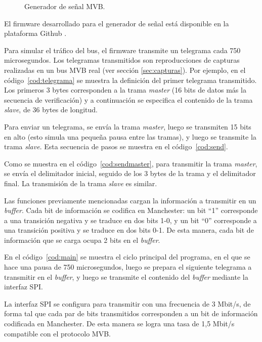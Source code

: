 \begin{figure}[htbp]
	\centering
    {
        \fontsize{8pt}{8pt}\selectfont
        
    }
	\caption{Generador de señal MVB.}
    \label{fig:generador}
\end{figure}

El firmware desarrollado para el generador de señal está disponible en la plataforma Github \cite{mvbgen}.

Para simular el tráfico del bus, el firmware transmite un telegrama cada 750 microsegundos.
Los telegramas transmitidos son reproducciones de capturas realizadas en un bus MVB real (ver sección \ref{sec:capturas}). Por ejemplo, en el código~\ref{cod:telegrama} se muestra la definición del primer telegrama transmitido.
Los primeros 3 bytes corresponden a la trama \textit{master} (16 bits de datos más la secuencia de verificación) y a continuación se especifica el contenido de la trama \textit{slave}, de 36 bytes de longitud.

Para enviar un telegrama, se envía la trama \textit{master}, luego se transmiten 15 bits en alto (esto simula una pequeña pausa entre las tramas), y luego se transmite la trama \textit{slave}. Esta secuencia de pasos se muestra en el código~\ref{cod:send}.

Como se muestra en el código~\ref{cod:sendmaster}, para transmitir la trama \textit{master}, se envía el delimitador inicial, seguido de los 3 bytes de la trama y el delimitador final. La transmisión de la trama \textit{slave} es similar.

Las funciones previamente mencionadas cargan la información a transmitir en un \textit{buffer}. Cada bit de información se codifica en Manchester: un bit ``1'' corresponde a una transición negativa y se traduce en dos bits 1-0, y un bit ``0'' corresponde a una transición positiva y se traduce en dos bits 0-1. De esta manera, cada bit de información que se carga ocupa 2 bits en el \textit{buffer}.

En el código~\ref{cod:main} se muestra el ciclo principal del programa, en el que se hace una pausa de 750 microsegundos, luego se prepara el siguiente telegrama a transmitir en el \textit{buffer}, y luego se transmite el contenido del \textit{buffer} mediante la interfaz SPI.

La interfaz SPI se configura para transmitir con una frecuencia de 3 Mbit/s, de forma tal que cada par de bits transmitidos corresponden a un bit de información codificada en Manchester. De esta manera se logra una tasa de 1,5 Mbit/s compatible con el protocolo MVB.

